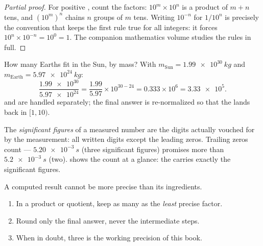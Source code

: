 \begin{proof}[Partial proof]
For positive , count the factors: $10^{m} \times 10^{n}$ is a
product of $m + n$ tens, and $(10^m)^n$ chains $n$ groups of $m$ tens.
Writing $10^{-n}$ for $1/10^{n}$ is precisely the convention that
keeps the first rule true for all integers: it forces
$10^{n} \times 10^{-n} = 10^{0} = 1$. The companion mathematics
volume studies the  rules in full.
\end{proof}

\begin{example}\label{ex:g10:orders-of-magnitude:scinot}
How many Earths fit in the Sun, by mass? With
$m_{\text{Sun}} = \qty{1.99e30}{kg}$ and
$m_{\text{Earth}} = \qty{5.97e24}{kg}$:
\[
\frac{\num{1.99e30}}{\num{5.97e24}}
= \frac{1.99}{5.97} \times 10^{30-24}
= 0.333 \times 10^{6}
= \num{3.33e5}.
\]
 and  are handled separately; the final answer is
re-normalized so that the  lands back in $[1, 10)$.
\end{example}

\begin{definition}\label{def:g10:orders-of-magnitude:sigfig}
The \emph{significant figures} of a
measured number are the digits actually vouched for by the
measurement: all written digits except the leading zeros. Trailing
zeros count --- $\qty{5.20e-3}{s}$ (three significant figures)
promises more than $\qty{5.2e-3}{s}$ (two).  shows
the count at a glance: the  carries exactly the significant
figures.
\end{definition}

\begin{method}\label{met:g10:orders-of-magnitude:sigfig}
A computed result cannot be more precise than its ingredients.
\begin{enumerate}
  \item In a product or quotient, keep as many  as
        the \emph{least} precise factor.
  \item Round only the final answer, never the intermediate steps.
  \item When in doubt, three  is the working
        precision of this book.
\end{enumerate}
\end{method}


